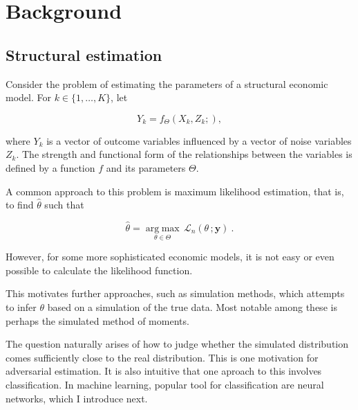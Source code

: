 
\section{Background} %
\label{sec:background}

\subsection{Structural estimation}
\label{sec:structural_estimation}

Consider the problem of estimating the parameters of a structural economic model.
For $k \in \{1,\dots,K\}$, let

\begin{equation}
    Y_k = f_{\Theta}(X_k, Z_k; ),
\end{equation}

where $Y_k$ is a vector of outcome variables influenced by a vector of noise variables $Z_k$. %
The strength and functional form of the relationships between the variables is defined by a function $f$ and its parameters $\Theta$.

A common approach to this problem is maximum likelihood estimation, that is, to find $\hat{\theta}$ such that

\begin{equation}
    \hat{\theta} = \underset{\theta\in\Theta}{\operatorname{arg\;max}}\,\mathcal{L}_{n}(\theta\,;\mathbf{y}) ~.
\end{equation}

However, for some more sophisticated economic models, it is not easy or even possible to calculate the likelihood function.

This motivates further approaches, such as simulation methods, which attempts to infer $\theta$ based on a simulation of the true data.
Most notable among these is perhaps the simulated method of moments.

The question naturally arises of how to judge whether the simulated distribution comes sufficiently close to the real distribution.
This is one motivation for adversarial estimation.
It is also intuitive that one aproach to this involves classification.
In machine learning, popular tool for classification are neural networks, which I introduce next.


